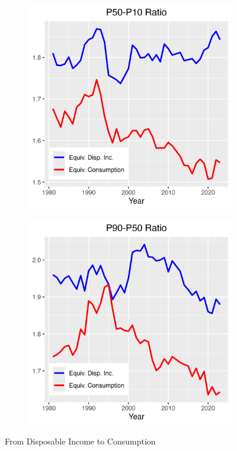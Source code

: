\documentclass{article}
\begin{document}
\begin{figure}
\begin{subfigure}[t]{0.475\textwidth}
        \label{fig:Consumption_Gini}
    \end{subfigure}
    \begin{subfigure}[t]{0.475\textwidth}
        \centering
        \includegraphics[width=\textwidth]{Fig_6/Fig_6c.png}
        \label{fig:Consumption_P50_P10}
    \end{subfigure}
    \begin{subfigure}[t]{0.475\textwidth}
        \centering
        \includegraphics[width=\textwidth]{Fig_6/Fig_6d.png}
        \label{fig:Consumption_P90_P50}
    \end{subfigure}
    \caption{From Disposable Income to Consumption}
    \label{fig:Consumption}
\end{figure}
\end{document}
